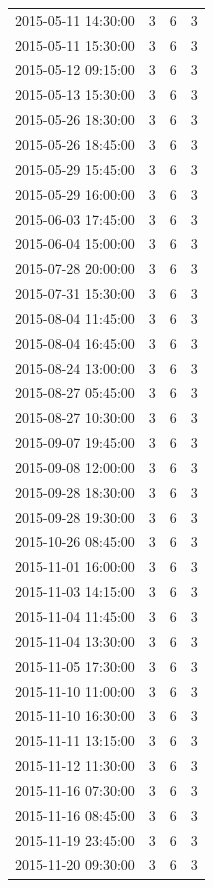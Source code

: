 \begin{tabular}{lrrr}
2015-05-11 14:30:00 & 3 & 6 & 3 \\
2015-05-11 15:30:00 & 3 & 6 & 3 \\
2015-05-12 09:15:00 & 3 & 6 & 3 \\
2015-05-13 15:30:00 & 3 & 6 & 3 \\
2015-05-26 18:30:00 & 3 & 6 & 3 \\
2015-05-26 18:45:00 & 3 & 6 & 3 \\
2015-05-29 15:45:00 & 3 & 6 & 3 \\
2015-05-29 16:00:00 & 3 & 6 & 3 \\
2015-06-03 17:45:00 & 3 & 6 & 3 \\
2015-06-04 15:00:00 & 3 & 6 & 3 \\
2015-07-28 20:00:00 & 3 & 6 & 3 \\
2015-07-31 15:30:00 & 3 & 6 & 3 \\
2015-08-04 11:45:00 & 3 & 6 & 3 \\
2015-08-04 16:45:00 & 3 & 6 & 3 \\
2015-08-24 13:00:00 & 3 & 6 & 3 \\
2015-08-27 05:45:00 & 3 & 6 & 3 \\
2015-08-27 10:30:00 & 3 & 6 & 3 \\
2015-09-07 19:45:00 & 3 & 6 & 3 \\
2015-09-08 12:00:00 & 3 & 6 & 3 \\
2015-09-28 18:30:00 & 3 & 6 & 3 \\
2015-09-28 19:30:00 & 3 & 6 & 3 \\
2015-10-26 08:45:00 & 3 & 6 & 3 \\
2015-11-01 16:00:00 & 3 & 6 & 3 \\
2015-11-03 14:15:00 & 3 & 6 & 3 \\
2015-11-04 11:45:00 & 3 & 6 & 3 \\
2015-11-04 13:30:00 & 3 & 6 & 3 \\
2015-11-05 17:30:00 & 3 & 6 & 3 \\
2015-11-10 11:00:00 & 3 & 6 & 3 \\
2015-11-10 16:30:00 & 3 & 6 & 3 \\
2015-11-11 13:15:00 & 3 & 6 & 3 \\
2015-11-12 11:30:00 & 3 & 6 & 3 \\
2015-11-16 07:30:00 & 3 & 6 & 3 \\
2015-11-16 08:45:00 & 3 & 6 & 3 \\
2015-11-19 23:45:00 & 3 & 6 & 3 \\
2015-11-20 09:30:00 & 3 & 6 & 3 \\

\end{tabular}
